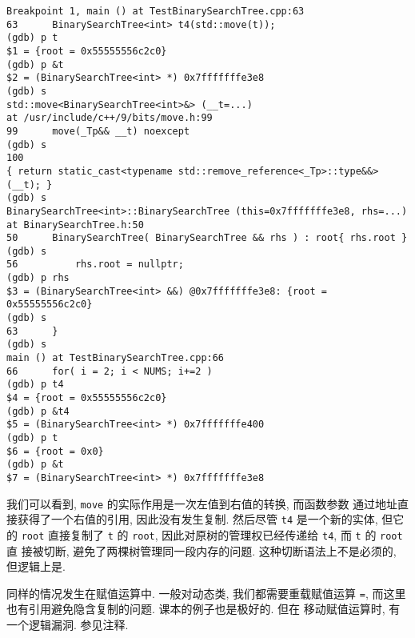\documentclass[a4paper]{ctexart}
\theoremstyle{definition}
\theoremstyle{definition}
\begin{document}
\begin{verbatim}
Breakpoint 1, main () at TestBinarySearchTree.cpp:63
63	    BinarySearchTree<int> t4(std::move(t));
(gdb) p t
$1 = {root = 0x55555556c2c0}
(gdb) p &t
$2 = (BinarySearchTree<int> *) 0x7fffffffe3e8
(gdb) s
std::move<BinarySearchTree<int>&> (__t=...) 
at /usr/include/c++/9/bits/move.h:99
99	    move(_Tp&& __t) noexcept
(gdb) s
100	    
{ return static_cast<typename std::remove_reference<_Tp>::type&&>(__t); }
(gdb) s
BinarySearchTree<int>::BinarySearchTree (this=0x7fffffffe3e8, rhs=...) 
at BinarySearchTree.h:50
50	    BinarySearchTree( BinarySearchTree && rhs ) : root{ rhs.root }
(gdb) s
56			rhs.root = nullptr;
(gdb) p rhs
$3 = (BinarySearchTree<int> &&) @0x7fffffffe3e8: {root = 0x55555556c2c0}
(gdb) s
63	    }
(gdb) s
main () at TestBinarySearchTree.cpp:66
66	    for( i = 2; i < NUMS; i+=2 )
(gdb) p t4
$4 = {root = 0x55555556c2c0}
(gdb) p &t4
$5 = (BinarySearchTree<int> *) 0x7fffffffe400
(gdb) p t
$6 = {root = 0x0}
(gdb) p &t
$7 = (BinarySearchTree<int> *) 0x7fffffffe3e8
\end{verbatim}

我们可以看到, \verb|move| 的实际作用是一次左值到右值的转换, 而函数参数
通过地址直接获得了一个右值的引用, 因此没有发生复制. 然后尽管 \verb|t4|
是一个新的实体, 但它的 \verb|root| 直接复制了 \verb|t| 的 \verb|root|,
因此对原树的管理权已经传递给 \verb|t4|, 而 \verb|t| 的 \verb|root| 直
接被切断, 避免了两棵树管理同一段内存的问题. 这种切断语法上不是必须的,
但逻辑上是.

同样的情况发生在赋值运算中. 一般对动态类, 我们都需要重载赋值运算
\verb|=|, 而这里也有引用避免隐含复制的问题. 课本的例子也是极好的. 但在
移动赋值运算时, 有一个逻辑漏洞. 参见注释.


\end{document}
